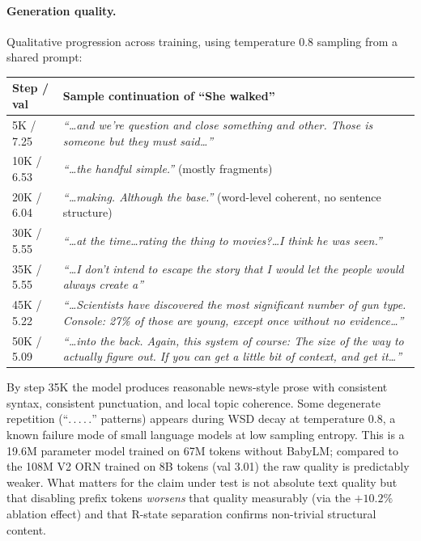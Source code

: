 \documentclass[11pt, a4paper]{article}
\theoremstyle{plain}
\theoremstyle{definition}
\theoremstyle{remark}
\begin{document}
\paragraph{Generation quality.}
Qualitative progression across training, using temperature 0.8 sampling from a shared prompt:

\begin{center}
\small
\begin{tabular}{l p{9.5cm}}
\toprule
Step / val & Sample continuation of ``She walked'' \\
\midrule
 5K / 7.25 & \textit{``\ldots and we're question and close something and other. Those is someone but they must said\ldots''} \\
10K / 6.53 & \textit{``\ldots the handful simple.''}  (mostly fragments) \\
20K / 6.04 & \textit{``\ldots making. Although the base.''}  (word-level coherent, no sentence structure) \\
30K / 5.55 & \textit{``\ldots at the time\ldots rating the thing to movies?\ldots I think he was seen.''} \\
35K / 5.55 & \textit{``\ldots I don't intend to escape the story that I would let the people would always create a''} \\
45K / 5.22 & \textit{``\ldots Scientists have discovered the most significant number of gun type. Console: 27\% of those are young, except once without no evidence\ldots''} \\
50K / 5.09 & \textit{``\ldots into the back. Again, this system of course: The size of the way to actually figure out. If you can get a little bit of context, and get it\ldots''} \\
\bottomrule
\end{tabular}
\end{center}
By step 35K the model produces reasonable news-style prose with consistent syntax, consistent punctuation, and local topic coherence.
Some degenerate repetition (``$.\,.\,.\,.\,.$'' patterns) appears during WSD decay at temperature 0.8, a known failure mode of small language models at low sampling entropy.
This is a 19.6M parameter model trained on 67M tokens without BabyLM; compared to the 108M V2 ORN trained on 8B tokens (val 3.01) the raw quality is predictably weaker.
What matters for the claim under test is not absolute text quality but that disabling prefix tokens \emph{worsens} that quality measurably (via the $+10.2\%$ ablation effect) and that R-state separation confirms non-trivial structural content.
\end{document}
